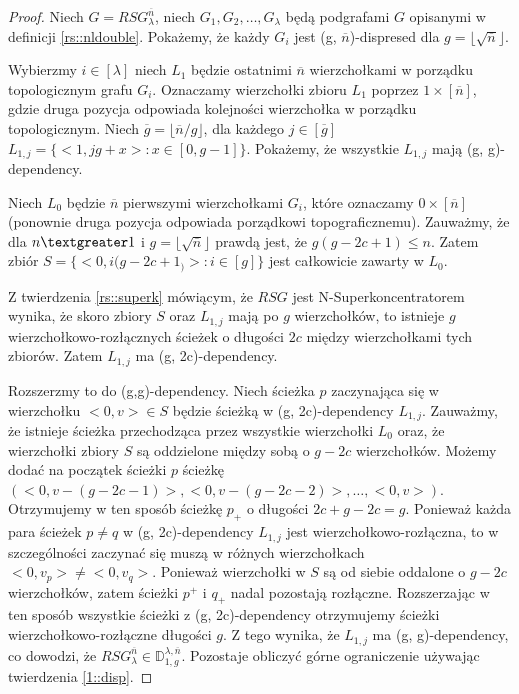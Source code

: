\begin{proof}
	Niech $G = RSG_{\lambda}^{ \overline{n}}$, niech $G_{1}, G_{2}, \dots , G_{ \lambda }$ będą
	podgrafami $G$ opisanymi w definicji \ref{rs::nldouble}.
	Pokażemy, że każdy $G_{i}$ jest (g, $\overline{n}$)-dispresed dla $g = \lfloor \sqrt{ \overline{n}} \rfloor $.
	
	Wybierzmy $i \in [ \lambda ]$ niech $L_{1}$ będzie ostatnimi $\overline{n}$ wierzchołkami w porządku topologicznym grafu $G_{i}$.
	Oznaczamy wierzchołki zbioru $L_{1}$ poprzez ${1} \times [ \overline{n} ]$, gdzie druga pozycja odpowiada kolejności wierzchołka w porządku topologicznym.
	Niech $ \overline{g} = \lfloor \overline{n} / g \rfloor$, dla każdego $j \in [ \overline{g}]$
	$L_{1, j} = \{ <1, jg + x> : x \in [0, g-1] \}$.
	Pokażemy, że wszystkie $L_{1, j}$ mają (g, g)-dependency.
	
	Niech $L_{0}$ będzie $\overline{n}$ pierwszymi wierzchołkami $G_{i}$, które oznaczamy ${0} \times [\overline{n}]$ (ponownie druga pozycja odpowiada porządkowi topograficznemu).
	Zauważmy, że dla $n \textgreater 1$ i $g = \lfloor \sqrt{ \overline{n}} \rfloor$ prawdą jest, że $g(g - 2c + 1) \leq n$.
	Zatem zbiór $S = \{ <0, i(g - 2c + 1_)>: i \in [g] \}$ jest całkowicie zawarty w $L_{0}$.
	
	Z twierdzenia \ref{rs::superk} mówiącym, że $RSG$ jest N-Superkoncentratorem wynika, że skoro zbiory $S$ oraz $L_{1,j}$ mają po $g$ wierzchołków, to istnieje $g$ wierzchołkowo-rozłącznych ścieżek o długości $2c$ między wierzchołkami tych zbiorów. Zatem $L_{1,j}$ ma (g, 2c)-dependency.
	
	Rozszerzmy to do (g,g)-dependency.
	Niech ścieżka $p$ zaczynająca się w wierzchołku $<0, v> \in S$ będzie ścieżką w (g, 2c)-dependency $L_{1,j}$. Zauważmy, że istnieje ścieżka przechodząca przez wszystkie wierzchołki $L_{0}$ oraz, że wierzchołki zbiory $S$ są oddzielone między sobą o $g - 2c$ wierzchołków.
	Możemy dodać na początek ścieżki $p$ ścieżkę $( <0, v - (g - 2c - 1)>, <0, v - (g - 2c -2)>, \dots, <0, v>)$.
	Otrzymujemy w ten sposób ścieżkę $p_{+}$ o długości $2c + g - 2c = g$.
	Ponieważ każda para ścieżek $p \neq q$ w (g, 2c)-dependency $L_{1,j}$ jest wierzchołkowo-rozłączna,
	to w szczególności zaczynać się muszą w różnych wierzchołkach $<0, v_{p}> \neq <0, v_{q}>$.
	Ponieważ wierzchołki w $S$ są od siebie oddalone o $g - 2c$ wierzchołków, zatem ścieżki $p^{+}$ i $q_{+}$ nadal pozostają rozłączne.
	Rozszerzając w ten sposób wszystkie ścieżki z (g, 2c)-dependency otrzymujemy ścieżki wierzchołkowo-rozłączne długości $g$. Z tego wynika, że $L_{1,j}$ ma (g, g)-dependency, co dowodzi, że $ RSG_{\lambda}^{ \overline{n}} \in \mathbb{D}_{1,g}^{\lambda, \overline{n}} $.
	Pozostaje obliczyć górne ograniczenie używając twierdzenia \ref{1::disp}.
	

\end{proof}
